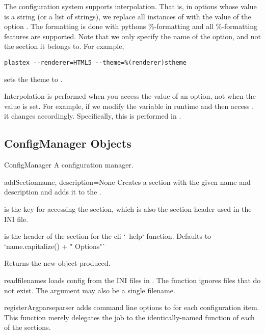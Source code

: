 The configuration system supports interpolation. That is, in options whose
value is a string (or a list of strings), we replace all instances of
 with the value of the option . The formatting is done
with pythons \%-formatting and all \%-formatting features are supported. Note
that we only specify the name of the option, and not the section it belongs to.
For example,
\begin{verbatim}
plastex --renderer=HTML5 --theme=%(renderer)stheme
\end{verbatim}
sets the theme to .

Interpolation is performed when you access the value of an option, not when the
value is set. For example, if we modify the  variable in runtime
and then access , it changes accordingly. Specifically, this is
performed in .

\subsection{ConfigManager Objects}

\begin{classdesc}{ConfigManager}{}
A configuration manager.
\end{classdesc}

\begin{methoddesc}[ConfigManager]{addSection}{name, description=None}
  Creates a section with the given name and description and adds it to the
  .

   is the key for accessing the section, which is also the section
        header used in the INI file.

   is the header of the section for the cli `--help` function.
  Defaults to `name.capitalize() + " Options"`

  Returns the new  object produced.
\end{methoddesc}

\begin{methoddesc}[ConfigManager]{read}{filenames}
loads config from the INI files in . The function ignores files
that do not exist. The argument may also be a single filename.
\end{methoddesc}

\begin{methoddesc}[ConfigManager]{registerArgparse}{parser}
  adds command line options to  for each configuration item. This
  function merely delegates the job to the identically-named function of each
  of the sections.
\end{methoddesc}

